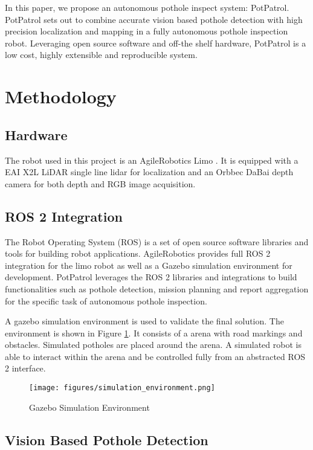 \documentclass[conference]{IEEEtran}
\begin{document}
In this paper, we propose an autonomous pothole inspect system: PotPatrol. PotPatrol sets out to combine accurate vision based pothole detection with high precision localization and mapping in a fully autonomous pothole inspection robot. Leveraging open source software and off-the shelf hardware, PotPatrol is a low cost, highly extensible and reproducible system.

\section{Methodology}

\subsection{Hardware}

The robot used in this project is an AgileRobotics Limo \cite{AgilexAi}. It is equipped with a EAI X2L LiDAR single line lidar \cite{YDLIDARX2_YDLIDARFocus} for localization and an Orbbec DaBai \cite{HomeORBBEC3D} depth camera for both depth and RGB image acquisition.

\subsection{ROS 2 Integration}

The Robot Operating System (ROS) is a set of open source software libraries and tools for building robot applications. AgileRobotics provides full ROS 2 integration for the limo robot as well as a Gazebo simulation environment for development. PotPatrol leverages the ROS 2 libraries and integrations to build functionalities such as pothole detection, mission planning and report aggregation for the specific task of autonomous pothole inspection.

A gazebo simulation environment is used to validate the final solution. The environment is shown in Figure \ref{fig:gazebo}. It consists of a arena with road markings and obstacles. Simulated potholes are placed around the arena. A simulated robot is able to interact within the arena and be controlled fully from an abstracted ROS 2 interface.

\begin{figure}[h]
    \centering
    \texttt{[image: figures/simulation\_environment.png]}
    \caption{Gazebo Simulation Environment}
    \label{fig:gazebo}
\end{figure}

\subsection{Vision Based Pothole Detection}
\end{document}
